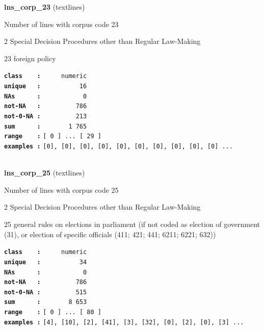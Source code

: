 \documentclass[]{article}
\begin{document}
\textbf{lns\_corp\_23} (textlines)

Number of lines with corpus code 23

2 Special Decision Procedures other than Regular Law-Making

23 foreign policy

\textbf{\texttt{class\ \ \ \ :}} \texttt{~~~~~numeric}\\
\textbf{\texttt{unique\ \ \ :}} \texttt{~~~~~~~~~~16}\\
\textbf{\texttt{NAs\ \ \ \ \ \ :}} \texttt{~~~~~~~~~~~0}\\
\textbf{\texttt{not-NA\ \ \ :}} \texttt{~~~~~~~~~786}\\
\textbf{\texttt{not-0-NA\ :}} \texttt{~~~~~~~~~213}\\
\textbf{\texttt{sum\ \ \ \ \ \ :}} \texttt{~~~~~~~1~765}\\
\textbf{\texttt{range\ \ \ \ :}}
\texttt{{[}\ 0\ {]}\ ...\ {[}\ 29\ {]}}\\
\textbf{\texttt{examples\ :}}
\texttt{{[}0{]},\ {[}0{]},\ {[}0{]},\ {[}0{]},\ {[}0{]},\ {[}0{]},\ {[}0{]},\ {[}0{]},\ {[}0{]},\ {[}0{]}\ ...}\\

~

\textbf{lns\_corp\_25} (textlines)

Number of lines with corpus code 25

2 Special Decision Procedures other than Regular Law-Making

25 general rules on elections in parliament (if not coded as election of
government (31), or election of specific officials (411; 421; 441; 6211;
6221; 632))

\textbf{\texttt{class\ \ \ \ :}} \texttt{~~~~~numeric}\\
\textbf{\texttt{unique\ \ \ :}} \texttt{~~~~~~~~~~34}\\
\textbf{\texttt{NAs\ \ \ \ \ \ :}} \texttt{~~~~~~~~~~~0}\\
\textbf{\texttt{not-NA\ \ \ :}} \texttt{~~~~~~~~~786}\\
\textbf{\texttt{not-0-NA\ :}} \texttt{~~~~~~~~~515}\\
\textbf{\texttt{sum\ \ \ \ \ \ :}} \texttt{~~~~~~~8~653}\\
\textbf{\texttt{range\ \ \ \ :}}
\texttt{{[}\ 0\ {]}\ ...\ {[}\ 80\ {]}}\\
\textbf{\texttt{examples\ :}}
\texttt{{[}4{]},\ {[}10{]},\ {[}2{]},\ {[}41{]},\ {[}3{]},\ {[}32{]},\ {[}0{]},\ {[}2{]},\ {[}0{]},\ {[}3{]}\ ...}\\
\end{document}
